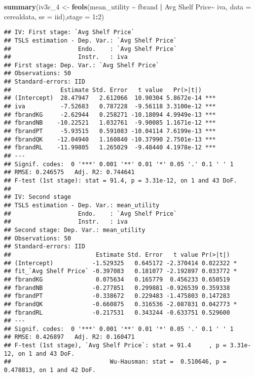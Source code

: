 \documentclass[
]{article}
\newenvironment{Shaded}{\begin{snugshade}}{\end{snugshade}}
\newcommand{\AttributeTok}[1]{\textcolor[rgb]{0.13,0.29,0.53}{#1}}
\newcommand{\DecValTok}[1]{\textcolor[rgb]{0.00,0.00,0.81}{#1}}
\newcommand{\FunctionTok}[1]{\textcolor[rgb]{0.13,0.29,0.53}{\textbf{#1}}}
\newcommand{\NormalTok}[1]{#1}
\newcommand{\OtherTok}[1]{\textcolor[rgb]{0.56,0.35,0.01}{#1}}
\newcommand{\SpecialCharTok}[1]{\textcolor[rgb]{0.81,0.36,0.00}{\textbf{#1}}}
\newcommand{\StringTok}[1]{\textcolor[rgb]{0.31,0.60,0.02}{#1}}
\begin{document}
\begin{Shaded}
\begin{Highlighting}[]
\FunctionTok{summary}\NormalTok{(iv3c\_4 }\OtherTok{\textless{}{-}} \FunctionTok{feols}\NormalTok{(mean\_utility }\SpecialCharTok{\textasciitilde{}}\NormalTok{ fbrand }\SpecialCharTok{|}  \StringTok{\textasciigrave{}}\AttributeTok{Avg Shelf Price}\StringTok{\textasciigrave{}}\SpecialCharTok{\textasciitilde{}}\NormalTok{ iva, }\AttributeTok{data =}\NormalTok{ cerealdata,}
                     \AttributeTok{se =} \StringTok{\textquotesingle{}iid\textquotesingle{}}\NormalTok{),}\AttributeTok{stage =} \DecValTok{1}\SpecialCharTok{:}\DecValTok{2}\NormalTok{)}
\end{Highlighting}
\end{Shaded}

\begin{verbatim}
## IV: First stage: `Avg Shelf Price`
## TSLS estimation - Dep. Var.: `Avg Shelf Price`
##                   Endo.    : `Avg Shelf Price`
##                   Instr.   : iva
## First stage: Dep. Var.: `Avg Shelf Price`
## Observations: 50
## Standard-errors: IID 
##              Estimate Std. Error   t value   Pr(>|t|)    
## (Intercept)  28.47947   2.612066  10.90304 5.8672e-14 ***
## iva          -7.52683   0.787228  -9.56118 3.3100e-12 ***
## fbrandKG     -2.62944   0.258271 -10.18094 4.9949e-13 ***
## fbrandNB    -10.22521   1.032761  -9.90085 1.1671e-12 ***
## fbrandPT     -5.93515   0.591083 -10.04114 7.6199e-13 ***
## fbrandQK    -12.04940   1.160840 -10.37990 2.7501e-13 ***
## fbrandRL    -11.99805   1.265029  -9.48440 4.1978e-12 ***
## ---
## Signif. codes:  0 '***' 0.001 '**' 0.01 '*' 0.05 '.' 0.1 ' ' 1
## RMSE: 0.246575   Adj. R2: 0.744641
## F-test (1st stage): stat = 91.4, p = 3.31e-12, on 1 and 43 DoF.
## 
## IV: Second stage
## TSLS estimation - Dep. Var.: mean_utility
##                   Endo.    : `Avg Shelf Price`
##                   Instr.   : iva
## Second stage: Dep. Var.: mean_utility
## Observations: 50
## Standard-errors: IID 
##                        Estimate Std. Error   t value Pr(>|t|)    
## (Intercept)           -1.529325   0.645172 -2.370414 0.022322 *  
## fit_`Avg Shelf Price` -0.397083   0.181077 -2.192897 0.033772 *  
## fbrandKG               0.075634   0.165779  0.456233 0.650519    
## fbrandNB              -0.277851   0.299881 -0.926539 0.359338    
## fbrandPT              -0.338672   0.229483 -1.475803 0.147283    
## fbrandQK              -0.660875   0.316536 -2.087831 0.042773 *  
## fbrandRL              -0.217531   0.343244 -0.633751 0.529600    
## ---
## Signif. codes:  0 '***' 0.001 '**' 0.01 '*' 0.05 '.' 0.1 ' ' 1
## RMSE: 0.426897   Adj. R2: 0.160471
## F-test (1st stage), `Avg Shelf Price`: stat = 91.4     , p = 3.31e-12, on 1 and 43 DoF.
##                            Wu-Hausman: stat =  0.510646, p = 0.478813, on 1 and 42 DoF.
\end{verbatim}
\end{document}
